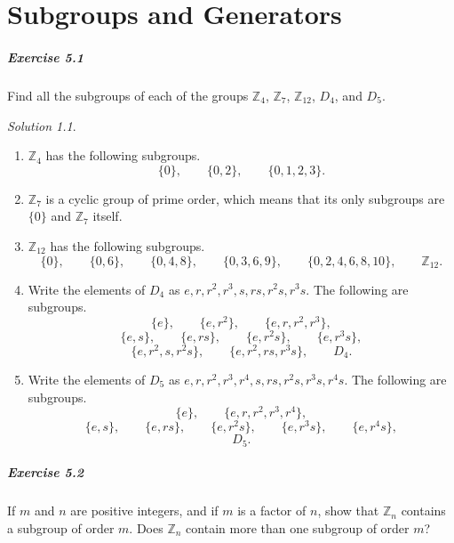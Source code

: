 \documentclass[11pt]{report}
\def\Z{\mathbb{Z}}
\theoremstyle{remark}
\newtheorem*{solution}{Solution}
\begin{document}
    
    \chapter{Subgroups and Generators}

    \paragraph{Exercise 5.1} Find all the subgroups of each of the groups $\Z_4$,
    $\Z_7$, $\Z_{12}$, $D_4$, and $D_5$.
    \begin{solution} \mbox{}
    \begin{enumerate}
        \item $\Z_4$ has the following subgroups. \[
            \{0\}, \qquad \{0, 2\}, \qquad \{0, 1, 2, 3\}.
        \] 
        \item $\Z_7$ is a cyclic group of prime order, which means that its only
        subgroups are $\{0\}$ and $\Z_7$ itself.
        \item $\Z_{12}$ has the following subgroups. \[
            \{0\}, \qquad \{0, 6\}, \qquad \{0, 4, 8\}, \qquad \{0, 3, 6, 9\},
            \qquad \{0, 2, 4, 6, 8, 10\}, \qquad \Z_{12}.
        \] 

        \item Write the elements of $D_4$ as $e, r, r^2, r^3, s, rs, r^2s, r^3s$.
        The following are subgroups. \[
            \{e\}, \qquad \{e, r^2\}, \qquad \{e, r, r^2, r^3\},
        \] \[
            \{e, s\}, \qquad \{e, rs\}, \qquad \{e, r^2s\}, \qquad \{e, r^3s\}, 
        \] \[
            \{e, r^2, s, r^2s\}, \qquad \{e, r^2, rs, r^3s\}, \qquad D_4.
        \] 
        \item Write the elements of $D_5$ as $e, r, r^2, r^3, r^4, s, rs, r^2s,
        r^3s, r^4s$. The following are subgroups. \[
            \{e\}, \qquad \{e, r, r^2, r^3, r^4\},
        \] \[
            \{e, s\}, \qquad \{e, rs\}, \qquad \{e, r^2s\}, \qquad \{e, r^3s\},
            \qquad \{e, r^4s\},
        \] \[
            D_5.
        \] 
    \end{enumerate}
    \end{solution}

    \paragraph{Exercise 5.2} If $m$ and $n$ are positive integers, and if $m$ is a
    factor of $n$, show that $\Z_n$ contains a subgroup of order $m$. Does $\Z_n$
    contain more than one subgroup of order $m$? 
\end{document}
